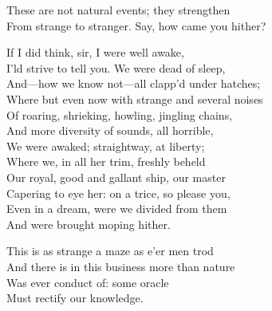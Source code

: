 \begin{verse_speech}[Ariel]
\end{verse_speech}


\begin{verse_speech}[Alonso] 
These are not natural events; they strengthen\\
From strange to stranger. Say, how came you hither?
\end{verse_speech}

\begin{verse_speech}[Boatswain] 
If I did think, sir, I were well awake,\\
I'ld strive to tell you. We were dead of sleep,\\
And—how we know not—all clapp'd under hatches;\\
Where but even now with strange and several noises\\
Of roaring, shrieking, howling, jingling chains,\\
And more diversity of sounds, all horrible,\\
We were awaked; straightway, at liberty;\\
Where we, in all her trim, freshly beheld\\
Our royal, good and gallant ship, our master\\
Capering to eye her: on a trice, so please you,\\
Even in a dream, were we divided from them\\
And were brought moping hither.
\end{verse_speech}



\begin{verse_speech}[Alonso] 
This is as strange a maze as e'er men trod\\
And there is in this business more than nature\\
Was ever conduct of: some oracle\\
Must rectify our knowledge.
\end{verse_speech}

